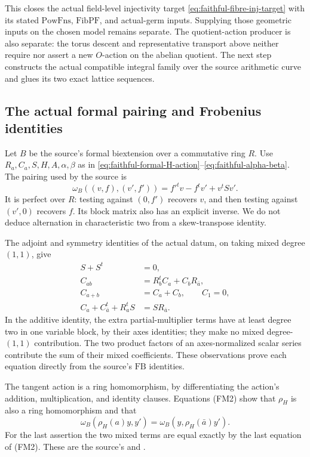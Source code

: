 This closes the actual field-level injectivity target
\eqref{eq:faithful-fibre-inj-target} with its stated
\(\mathrm{PowFns}\), \(\mathrm{FibPF}\), and actual-germ
inputs.  Supplying those geometric inputs on the chosen
model remains separate.
The quotient-action producer is also separate:
the torus descent and representative transport above
neither require nor assert a new \(O\)-action on the
abelian quotient.
The next step constructs the actual compatible integral
family over the source arithmetic curve and glues its
two exact lattice sequences.

\subsection{The actual formal pairing and Frobenius identities}
\label{subsec:faithful-formal-pairing-transport}

Let \(B\) be the source's formal biextension over a
commutative ring \(R\).
Use \(R_a,C_a,S,H,A,\alpha,\beta\) as in
\eqref{eq:faithful-formal-H-action}--\eqref{eq:faithful-alpha-beta}.
The pairing used by the source is
\[
 \omega_B((v,f),(v',f'))=f'^tv-f^tv'+v^tSv'.
 \tag{FM1}\label{eq:faithful-pairH}
\]
It is perfect over \(R\): testing against \((0,f')\)
recovers \(v\), and then testing against \((v',0)\)
recovers \(f\).  Its block matrix also has an explicit
inverse.  We do not deduce alternation in characteristic
two from a skew-transpose identity.

The adjoint and symmetry identities of the actual datum,
on taking mixed degree \((1,1)\), give
\[
 \begin{split}
 S+S^t&=0,\\
 C_{ab}&=R_b^tC_a+C_bR_{\bar a},\\
 C_{a+b}&=C_a+C_b,\qquad C_1=0,\\
 C_a+C_{\bar a}^t+R_a^tS&=SR_{\bar a}.
 \end{split}
 \tag{FM2}\label{eq:faithful-pairH-coefficients}
\]
In the additive identity, the extra partial-multiplier
terms have at least degree two in one variable block,
by their axes identities; they make no mixed
degree-\((1,1)\) contribution.
The two product factors of an axes-normalized scalar
series contribute the sum of their mixed coefficients.
These observations prove each equation directly from
the source's \(\mathrm{FB}\) identities.

The tangent action is a ring homomorphism, by
differentiating the action's addition, multiplication,
and identity clauses.
Equations (FM2) show that \(\rho_H\) is also a ring
homomorphism and that
\[
              \omega_B(\rho_H(a)y,y')
                        =\omega_B(y,\rho_H(\bar a)y').
 \tag{FM3}\label{eq:faithful-pairH-adjoint}
\]
For the last assertion the two mixed terms are equal
exactly by the last equation of (FM2).
These are the source's
 and
.

